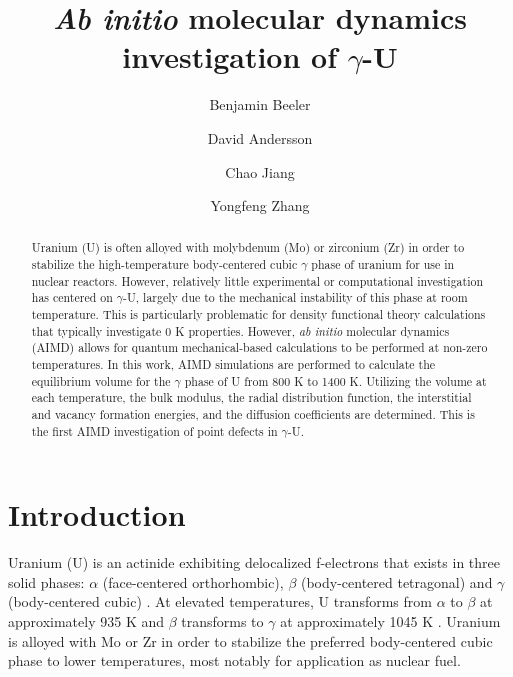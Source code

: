 \documentclass[review]{elsarticle}
\begin{document}
\begin{frontmatter}
\title{\textit{Ab initio} molecular dynamics investigation of $\gamma$-U}

\author[inl]{Benjamin Beeler}
\author[lanl]{David Andersson}
\author[inl]{Chao Jiang}
\author[inl]{Yongfeng Zhang}
\address[inl]{Idaho National Laboratory, Idaho Falls, ID 83415}
\address[lanl]{Los Alamos National Laboratory, Los Alamos, NM 87545}

\begin{abstract}

Uranium (U) is often alloyed with molybdenum (Mo) or zirconium (Zr) in order to stabilize the high-temperature body-centered cubic $\gamma$ phase of uranium for use in nuclear reactors. However, relatively little experimental or computational investigation has centered on $\gamma$-U, largely due to the mechanical instability of this phase at room temperature. This is particularly problematic for density functional theory calculations that typically investigate 0 K properties. However, \textit{ab initio} molecular dynamics (AIMD) allows for quantum mechanical-based calculations to be performed at non-zero temperatures. In this work, AIMD simulations are performed to calculate the equilibrium volume for the $\gamma$ phase of U from 800 K to 1400 K. Utilizing the volume at each temperature, the bulk modulus, the radial distribution function, the interstitial and vacancy formation energies, and the diffusion coefficients are determined. This is the first AIMD investigation of point defects in $\gamma$-U. 

\end{abstract}
\end{frontmatter}

\section{Introduction}

Uranium (U) is an actinide exhibiting delocalized f-electrons that exists in three solid phases: $\alpha$ (face-centered orthorhombic), $\beta$ (body-centered tetragonal) and $\gamma$ (body-centered cubic) \cite{yoo1998}. At elevated temperatures, U transforms from $\alpha$ to $\beta$ at approximately 935 K and $\beta$ transforms to $\gamma$ at approximately 1045 K \cite{soderlind1998}. Uranium is alloyed with Mo or Zr in order to stabilize the preferred body-centered cubic phase to lower temperatures, most notably for application as nuclear fuel. 
\end{document}
